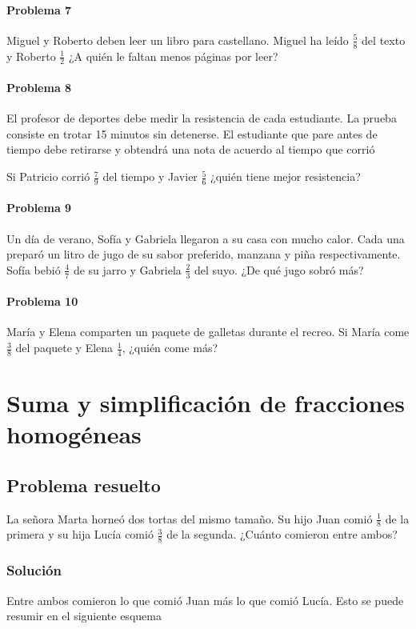 \documentclass[10pt,twoside]{article}
\begin{document}
\paragraph*{Problema 7}
Miguel y Roberto deben leer un libro para castellano. Miguel ha le\'{i}do $\frac{5}{8}$ del texto y Roberto $\frac{1}{2}$ ¿A qui\'{e}n le faltan menos p\'{a}ginas por leer?
\paragraph*{Problema 8}
El profesor de deportes debe medir la resistencia de cada estudiante. La prueba consiste en trotar 15 minutos sin detenerse. El estudiante que pare antes de tiempo debe retirarse y obtendr\'{a} una nota de acuerdo al tiempo que corri\'{o}

Si Patricio corri\'{o} $\frac{7}{9}$ del tiempo y Javier $\frac{5}{6}$ ¿qui\'{e}n tiene mejor resistencia?
\paragraph*{Problema 9}
Un d\'{i}a de verano, Sof\'{i}a y Gabriela llegaron a su casa con mucho calor. Cada una prepar\'{o} un litro de jugo de su sabor preferido, manzana y piña respectivamente. Sof\'{i}a bebi\'{o} $\frac{4}{7}$ de su jarro y Gabriela $\frac{2}{3}$ del suyo. ¿De qu\'{e} jugo sobr\'{o} m\'{a}s?
\paragraph*{Problema 10}
Mar\'{i}a y Elena comparten un paquete de galletas durante el recreo. Si Mar\'{i}a come $\frac{3}{8}$ del paquete y Elena $\frac{1}{4}$, ¿qui\'{e}n come m\'{a}s?
\section*{Suma y simplificaci\'{o}n de fracciones homog\'{e}neas}
\subsection*{Problema resuelto}
La señora Marta horneó dos tortas del mismo tamaño. Su hijo Juan comió $\frac{1}{8}$ de la primera y su hija Lucía comió $\frac{3}{8}$ de la segunda. ¿Cuánto comieron entre ambos?
\subsubsection*{Solución}
Entre ambos comieron lo que comió Juan más lo que comió Lucía. Esto se puede resumir en el siguiente esquema
\end{document}
